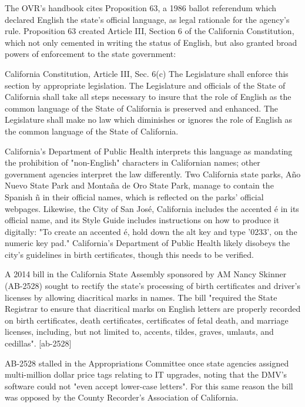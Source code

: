 The OVR's handbook cites Proposition 63, a 1986 ballot referendum which declared
English the state's official language, as legal rationale for the agency's rule.
Proposition 63 created Article III, Section 6 of the California Constitution,
which not only cemented in writing the status of English, but also granted broad
powers of enforcement to the state government: 

\begin{aquote}{California Constitution, Article III, Sec. 6(c)}
The Legislature shall enforce this section by appropriate legislation. The
Legislature and officials of the State of California shall take all steps
necessary to insure that the role of English as the common language of the State
of California is preserved and enhanced. The Legislature shall make no law which
diminishes or ignores the role of English as the common language of the State of
California.
\end{aquote}

California's Department of Public Health interprets this language as mandating
the prohibition of "non-English" characters in Californian names; other
government agencies interpret the law differently. Two California state parks,
Año Nuevo State Park and Montaña de Oro State Park, manage to contain the
Spanish ñ in their official names, which is reflected on the parks' official
webpages. \parencite{año-nuevo} \parencite{montaña-de-oro} Likewise, the City of
San José, California includes the accented é in its official name, and its Style
Guide includes instructions on how to produce it digitally: "To create an
accented é, hold down the alt key and type '0233'‚ on the numeric key pad."
\textcite{san-josé} California's Department of Public Health likely disobeys the
city's guidelines in birth certificates, though this needs to be verified.

A 2014 bill in the California State Assembly sponsored by AM Nancy Skinner
(AB-2528) sought to rectify the state's processing of birth certificates and
driver's licenses by allowing diacritical marks in names. The bill "required the
State Registrar to ensure that diacritical marks on English letters are properly
recorded on birth certificates, death certificates, certificates of fetal death,
and marriage licenses, including, but not limited to, accents, tildes, graves,
umlauts, and cedillas". [ab-2528]

AB-2528 stalled in the Appropriations Committee once state agencies assigned
multi-million dollar price tags relating to IT upgrades, noting that the DMV's
software could not "even accept lower-case letters". For this same reason the
bill was opposed by the County Recorder's Association of California.

